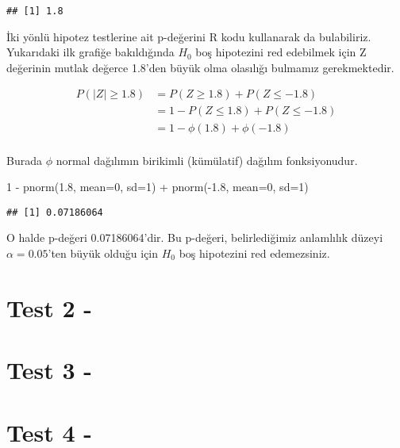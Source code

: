 \documentclass[
  12pt,
]{book}
\newenvironment{Shaded}{\begin{snugshade}}{\end{snugshade}}
\newcommand{\AttributeTok}[1]{\textcolor[rgb]{0.77,0.63,0.00}{#1}}
\newcommand{\DecValTok}[1]{\textcolor[rgb]{0.00,0.00,0.81}{#1}}
\newcommand{\FloatTok}[1]{\textcolor[rgb]{0.00,0.00,0.81}{#1}}
\newcommand{\FunctionTok}[1]{\textcolor[rgb]{0.00,0.00,0.00}{#1}}
\newcommand{\NormalTok}[1]{#1}
\newcommand{\SpecialCharTok}[1]{\textcolor[rgb]{0.00,0.00,0.00}{#1}}
\begin{document}
\begin{verbatim}
## [1] 1.8
\end{verbatim}

İki yönlü hipotez testlerine ait p-değerini R kodu kullanarak da bulabiliriz. Yukarıdaki ilk grafiğe bakıldığında \(H_{0}\) boş hipotezini red edebilmek için Z değerinin mutlak değerce 1.8'den büyük olma olasılığı bulmamız gerekmektedir.

\begin{equation}
\begin{split}
P \left( |Z| \geq 1.8 \right) &= P(Z \geq 1.8) + P(Z \leq -1.8) \\
&= 1 - P(Z \leq 1.8) + P(Z \leq -1.8) \\
&= 1 - \phi(1.8) +\phi(-1.8)\\
\end{split}
\end{equation}

Burada \(\phi\) normal dağılımın birikimli (kümülatif) dağılım fonksiyonudur.

\begin{Shaded}
\begin{Highlighting}[]
\DecValTok{1} \SpecialCharTok{{-}} \FunctionTok{pnorm}\NormalTok{(}\FloatTok{1.8}\NormalTok{, }\AttributeTok{mean=}\DecValTok{0}\NormalTok{, }\AttributeTok{sd=}\DecValTok{1}\NormalTok{) }\SpecialCharTok{+} \FunctionTok{pnorm}\NormalTok{(}\SpecialCharTok{{-}}\FloatTok{1.8}\NormalTok{, }\AttributeTok{mean=}\DecValTok{0}\NormalTok{, }\AttributeTok{sd=}\DecValTok{1}\NormalTok{)}
\end{Highlighting}
\end{Shaded}

\begin{verbatim}
## [1] 0.07186064
\end{verbatim}

O halde p-değeri 0.07186064'dir. Bu p-değeri, belirlediğimiz anlamlılık düzeyi \(\alpha = 0.05\)'ten büyük olduğu için \(H_{0}\) boş hipotezini red edemezsiniz.

\hypertarget{test-2--}{%
\section{Test 2 -}\label{test-2--}}

\hypertarget{test-3--}{%
\section{Test 3 -}\label{test-3--}}

\hypertarget{test-4--}{%
\section{Test 4 -}\label{test-4--}}

  
\end{document}
